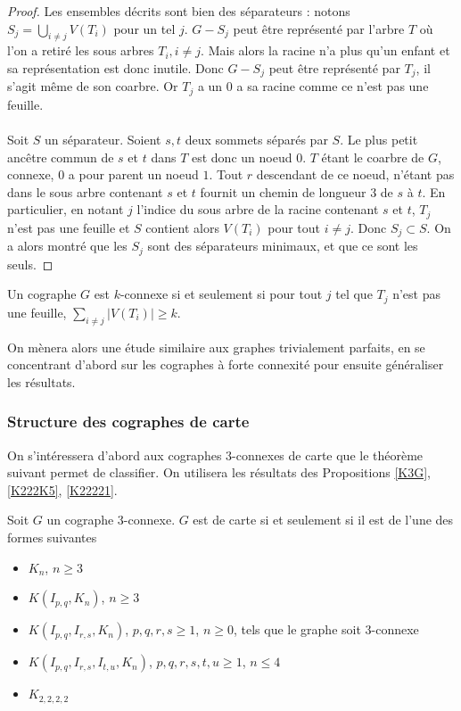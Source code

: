 \documentclass{scrartcl}
\begin{document}
\begin{flushleft}
\begin{proof}
    Les ensembles décrits sont bien des séparateurs : notons $\displaystyle S_j = \bigcup_{i \neq j} V(T_i)$ pour un tel $j$. $G - S_j$ peut être
    représenté par l'arbre $T$ où l'on a retiré les sous arbres $T_i, i \neq j$. Mais alors la racine n'a plus qu'un enfant et sa représentation est donc
    inutile. Donc $G - S_j$ peut être représenté par $T_j$, il s'agit même de son coarbre. Or $T_j$ a un $0$ a sa racine comme ce n'est pas une feuille.
    \\~\\
    Soit $S$ un séparateur. Soient $s, t$ deux sommets séparés par $S$. Le plus petit ancêtre commun de $s$ et $t$ dans $T$
    est donc un noeud $0$. $T$ étant le coarbre de $G$, connexe, $0$ a pour parent un noeud $1$. Tout $r$ descendant de ce noeud, n'étant pas dans le
    sous arbre contenant $s$ et $t$ fournit un chemin de longueur $3$ de $s$ à $t$. En particulier, en notant $j$ l'indice du sous arbre de la racine
    contenant $s$ et $t$, $T_j$ n'est pas une feuille et $S$ contient alors $V(T_i)$ pour tout $i \neq j$. Donc $S_j \subset S$. On a
    alors montré que les $S_j$ sont des séparateurs minimaux, et que ce sont les seuls.
\end{proof}

\begin{cor}\label{coarbrekconn}
    Un cographe $G$ est $k$-connexe si et seulement si pour tout $j$ tel que $T_j$ n'est pas une feuille, $\sum_{i \neq j} |V(T_i)| \geq k$.
\end{cor}

On mènera alors une étude similaire aux graphes trivialement parfaits, en se concentrant d'abord sur les cographes à forte connexité pour ensuite
généraliser les résultats.

\subsubsection{Structure des cographes de carte}

On s'intéressera d'abord aux cographes $3$-connexes de carte que le théorème suivant permet de classifier. On utilisera les résultats
des Propositions \ref{K3G}, \ref{K222K5}, \ref{K22221}.

\begin{theorem}\label{cograph3conn}
    Soit $G$ un cographe $3$-connexe. $G$ est de carte si et seulement si il est de l'une des formes suivantes
    \begin{itemize}
        \item $K_n$, $n \geq 3$
        \item $K(I_{p,q}, K_n)$, $n \geq 3$
        \item $K(I_{p,q}, I_{r,s}, K_n)$, $p,q,r,s \geq 1$, $n \geq 0$, tels que le graphe soit $3$-connexe
        \item $K(I_{p,q}, I_{r,s}, I_{t,u}, K_n)$, $p,q,r,s,t,u \geq 1$, $n \leq 4$
        \item $K_{2,2,2,2}$
    \end{itemize}
\end{theorem}


\end{flushleft}
\end{document}
